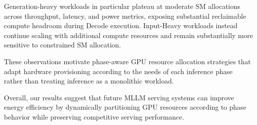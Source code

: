 \documentclass[10pt,twocolumn]{article}
\begin{document}
Generation-heavy workloads in particular plateau at moderate SM allocations across throughput, latency, and power metrics, exposing substantial reclaimable compute headroom during Decode execution. Input-Heavy workloads instead continue scaling with additional compute resources and remain substantially more sensitive to constrained SM allocation.

These observations motivate phase-aware GPU resource allocation strategies that adapt hardware provisioning according to the needs of each inference phase rather than treating inference as a monolithic workload.

Overall, our results suggest that future MLLM serving systems can improve energy efficiency by dynamically partitioning GPU resources according to phase behavior while preserving competitive serving performance.

\balance


\end{document}
